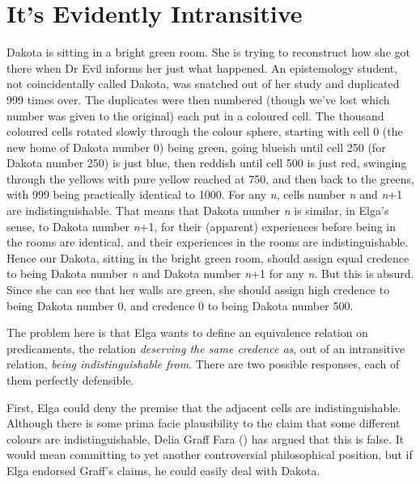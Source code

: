 \documentclass[
  11pt,
  letterpaper,
  DIV=11,
  numbers=noendperiod,
  twoside]{scrartcl}
\begin{document}
\section{It's Evidently Intransitive}\label{its-evidently-intransitive}

Dakota is sitting in a bright green room. She is trying to reconstruct
how she got there when Dr Evil informs her just what happened. An
epistemology student, not coincidentally called Dakota, was snatched out
of her study and duplicated 999 times over. The duplicates were then
numbered (though we've lost which number was given to the original) each
put in a coloured cell. The thousand coloured cells rotated slowly
through the colour sphere, starting with cell 0 (the new home of Dakota
number 0) being green, going blueish until cell 250 (for Dakota number
250) is just blue, then reddish until cell 500 is just red, swinging
through the yellows with pure yellow reached at 750, and then back to
the greens, with 999 being practically identical to 1000. For any
\emph{n}, cells number \emph{n} and \emph{n}+1 are indistinguishable.
That means that Dakota number \emph{n} is similar, in Elga's sense, to
Dakota number \emph{n}+1, for their (apparent) experiences before being
in the rooms are identical, and their experiences in the rooms are
indistinguishable. Hence our Dakota, sitting in the bright green room,
should assign equal credence to being Dakota number \emph{n} and Dakota
number \emph{n}+1 for any \emph{n}. But this is absurd. Since she can
see that her walls are green, she should assign high credence to being
Dakota number 0, and credence 0 to being Dakota number 500.

The problem here is that Elga wants to define an equivalence relation on
predicaments, the relation \emph{deserving the same credence as}, out of
an intransitive relation, \emph{being indistinguishable from}. There are
two possible responses, each of them perfectly defensible.

First, Elga could deny the premise that the adjacent cells are
indistinguishable. Although there is some prima facie plausibility to
the claim that some different colours are indistinguishable, Delia Graff
Fara () has argued that this is false. It
would mean committing to yet another controversial philosophical
position, but if Elga endorsed Graff's claims, he could easily deal with
Dakota.
\end{document}
